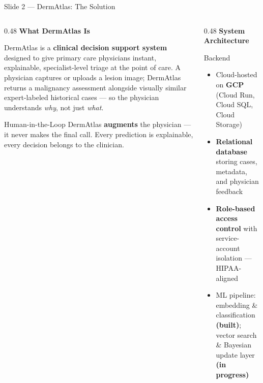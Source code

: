 \documentclass[aspectratio=169, 9pt]{beamer}
\begin{document}
\begin{frame}{Slide 2 --- DermAtlas: The Solution}

  \begin{columns}[T]

    \begin{column}{0.48\textwidth}
      \textbf{\color{navyblue}What DermAtlas Is}

      \vspace{0.3em}
      {\small
      DermAtlas is a \textbf{clinical decision support system}
      designed to give primary care physicians instant,
      explainable, specialist-level triage at the point of care.
      A physician captures or uploads a lesion image; DermAtlas
      returns a malignancy assessment alongside visually similar
      expert-labeled historical cases --- so the physician
      understands \textit{why}, not just \textit{what}.
      }

      \vspace{0.4em}
      \begin{exampleblock}{Human-in-the-Loop}
        \small
        DermAtlas \textbf{augments} the physician --- it never
        makes the final call. Every prediction is explainable,
        every decision belongs to the clinician.
      \end{exampleblock}
    \end{column}

    \begin{column}{0.48\textwidth}
      \textbf{\color{navyblue}System Architecture}

      \vspace{0.3em}
      \begin{block}{Backend}
        \small
        \begin{itemize}[leftmargin=1em, itemsep=2pt]
          \item Cloud-hosted on \textbf{GCP} (Cloud Run, Cloud SQL,
            Cloud Storage)
          \item \textbf{Relational database} storing cases, metadata,
            and physician feedback
          \item \textbf{Role-based access control} with service-account
            isolation --- HIPAA-aligned
          \item ML pipeline: embedding \& classification \textbf{(built)};
            vector search \& Bayesian update layer \textbf{(in progress)}
        \end{itemize}
      \end{block}


\end{column}
\end{columns}
\end{frame}
\end{document}
